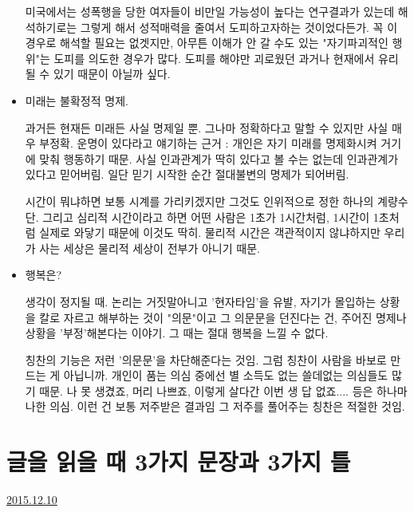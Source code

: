 \begin{itemize}
    미국에서는 성폭행을 당한 여자들이 비만일 가능성이 높다는 연구결과가 있는데
    해석하기로는 그렇게 해서 성적매력을 줄여서 도피하고자하는 것이었다든가.
    꼭 이 경우로 해석할 필요는 없겟지만, 아무튼 이해가 안 갈 수도 있는 "자기파괴적인 행위"는 도피를 의도한 경우가 많다.
    도피를 해야만 괴로웠던 과거나 현재에서 유리될 수 있기 때문이 아닐까 싶다.
    \vspace{5mm}

    \item 미래는 불확정적 명제.
    \vspace{5mm}

    과거든 현재든 미래든 사실 명제일 뿐.
    그나마 정확하다고 말할 수 있지만 사실 매우 부정확.
    운명이 있다라고 얘기하는 근거 : 개인은 자기 미래를 명제화시켜 거기에 맞춰 행동하기 때문.
    사실 인과관계가 딱히 있다고 볼 수는 없는데 인과관계가 있다고 믿어버림. 일단 믿기 시작한 순간 절대불변의 명제가 되어버림.
    \vspace{5mm}

    시간이 뭐냐하면 보통 시계를 가리키겠지만 그것도 인위적으로 정한 하나의 계량수단.
    그리고 심리적 시간이라고 하면 어떤 사람은 1초가 1시간처럼, 1시간이 1초처럼 실제로 와닿기 때문에 이것도 딱히.
    물리적 시간은 객관적이지 않냐하지만 우리가 사는 세상은 물리적 세상이 전부가 아니기 때문.
    \vspace{5mm}

    \item 행복은?
    \vspace{5mm}

    생각이 정지될 때.
    논리는 거짓말아니고 '현자타임'을 유발, 자기가 몰입하는 상황을 칼로 자르고 해부하는 것이 "의문"이고
    그 의문문을 던진다는 건, 주어진 명제나 상황을 '부정'해본다는 이야기. 그 때는 절대 행복을 느낄 수 없다.
    \vspace{5mm}

    칭찬의 기능은 저런 '의문문'을 차단해준다는 것임. 그럼 칭찬이 사람을 바보로 만드는 게 아닙니까.
    개인이 품는 의심 중에선 별 소득도 없는 쓸데없는 의심들도 많기 때문.
    나 못 생겼죠, 머리 나쁘죠, 이렇게 살다간 이번 생 답 없죠.... 등은 하나마나한 의심. 이런 건 보통 저주받은 결과임
    그 저주를 풀어주는 칭찬은 적절한 것임.
    \vspace{5mm}
\end{itemize}









\section{글을 읽을 때 3가지 문장과 3가지 틀}
\href{https://www.kockoc.com/Apoc/533693}{2015.12.10}

